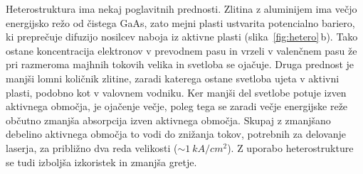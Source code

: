 Heterostruktura ima nekaj poglavitnih prednosti. Zlitina z aluminijem ima večjo 
energijsko režo od čistega GaAs, zato mejni plasti ustvarita potencialno bariero, 
ki preprečuje difuzijo nosilcev naboja iz aktivne plasti (slika~\ref{fig:hetero}\,b). Tako ostane koncentracija 
elektronov v prevodnem pasu in vrzeli v valenčnem pasu že pri razmeroma majhnih tokovih
velika in svetloba se ojačuje. Druga prednost je manjši lomni količnik zlitine, 
zaradi katerega ostane svetloba ujeta v aktivni plasti, podobno kot v valovnem 
vodniku. Ker manjši del svetlobe potuje izven aktivnega območja, je ojačenje večje,
poleg tega se zaradi večje energijske reže občutno zmanjša absorpcija izven aktivnega območja.
Skupaj z zmanjšano debelino aktivnega območja to vodi do znižanja tokov, 
potrebnih za delovanje laserja, za približno dva reda velikosti ($\sim 1~\si{kA}/\si{cm}^2$). 
Z uporabo heterostrukture se tudi izboljša izkoristek in zmanjša gretje.  

